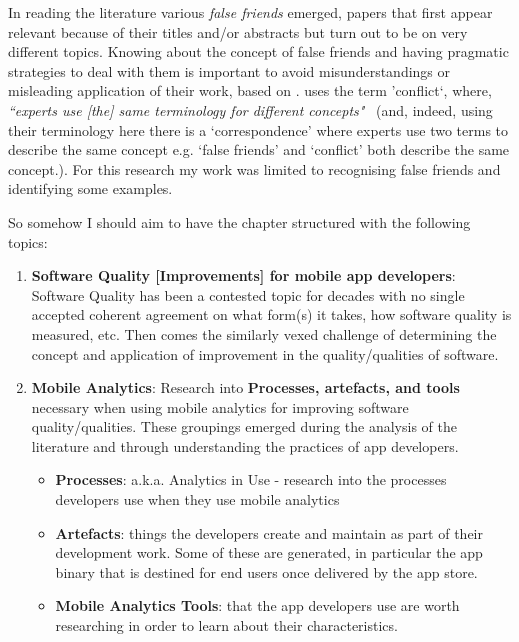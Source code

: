 In reading the literature various \textit{false friends} emerged, papers that first appear relevant because of their titles and/or abstracts but turn out to be on very different topics. 
Knowing about the concept of false friends and having pragmatic strategies to deal with them is important to avoid misunderstandings or misleading application of their work, 
based on \cite[p. 1833]{chamizodominguez2002_false_friends_their_origins_and_semantics_in_some_languages}. 
\textcite{shaw1989_comparing_conceptual_structures__consensus_conflict_correspondence_and_contrast} uses the term 'conflict`, where, \emph{``experts use [the] same terminology for different concepts"}~\cite[p. 3]{shaw1989_comparing_conceptual_structures__consensus_conflict_correspondence_and_contrast} (and, indeed, using their terminology here there is a `correspondence' where experts use two terms to describe the same concept e.g. `false friends' and `conflict' both describe the same concept.). For this research my work was limited to recognising false friends and identifying some examples. 

So somehow I should aim to have the chapter structured with the following topics:
\begin{enumerate}
    \item \textbf{Software Quality [Improvements] for mobile app developers}: Software Quality has been a contested topic for decades with no single accepted coherent agreement on what form(s) it takes, how software quality is measured, etc. Then comes the similarly vexed challenge of determining the concept and application of improvement in the quality/qualities of software. 
    \item \textbf{Mobile Analytics}: Research into \textbf{Processes, artefacts, and tools} necessary when using mobile analytics for improving software quality/qualities. These groupings emerged during the analysis of the literature and through understanding the practices of app developers.
    \begin{itemize}
        \item \textbf{Processes}: a.k.a. Analytics in Use - research into the processes developers use when they use mobile analytics
        \item \textbf{Artefacts}: things the developers create and maintain as part of their development work. Some of these are generated, in particular the app binary that is destined for end users once delivered by the app store.
        \item \textbf{Mobile Analytics Tools}: that the app developers use are worth researching in order to learn about their characteristics.
    \end{itemize}
\end{enumerate}

